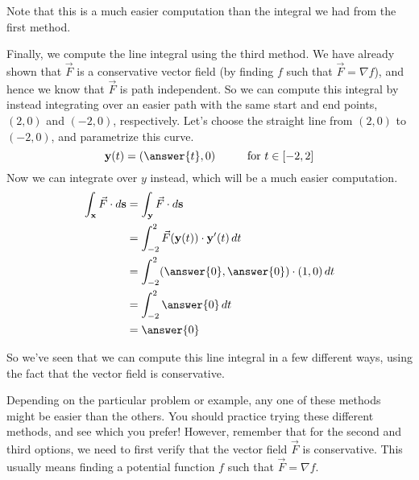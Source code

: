\documentclass{ximera}
\begin{document}
\begin{example}
\begin{explanation}
Note that this is a much easier computation than the integral we had from the first method.

Finally, we compute the line integral using the third method. We have already shown that $\vec{F}$ is a conservative vector field (by finding $f$ such that $\vec{F}=\nabla f$), and hence we know that $\vec{F}$ is path independent. So we can compute this integral by instead integrating over an easier path with the same start and end points, $(2,0)$ and $(-2,0)$, respectively. Let's choose the straight line from $(2,0)$ to $(-2,0)$, and parametrize this curve.
\[
\textbf{y}(t)=(\answer{t}, 0)\hspace{1cm} \textrm{for }t\in[-2,2]
\]
Now we can integrate over $y$ instead, which will be a much easier computation.
\begin{align*}
\int_{\textbf{x}}\vec{F}\cdot d\textbf{s}  &= \int_{\textbf{y}}\vec{F}\cdot d\textbf{s}\\
&= \int_{-2}^{2} \vec{F}(\textbf{y}(t))\cdot \textbf{y}'(t)\,dt\\
&= \int_{-2}^{2} (\answer{0},\answer{0})\cdot (1,0)\,dt\\
&= \int_{-2}^{2} \answer{0}\,dt\\
&= \answer{0}
\end{align*}

So we've seen that we can compute this line integral in a few different ways, using the fact that the vector field is conservative.
\end{explanation}
\end{example}

Depending on the particular problem or example, any one of these methods might be easier than the others. You should practice trying these different methods, and see which you prefer! However, remember that for the second and third options, we need to first verify that the vector field $\vec{F}$ is conservative. This usually means finding a potential function $f$ such that $\vec{F}=\nabla f$.
\end{document}
